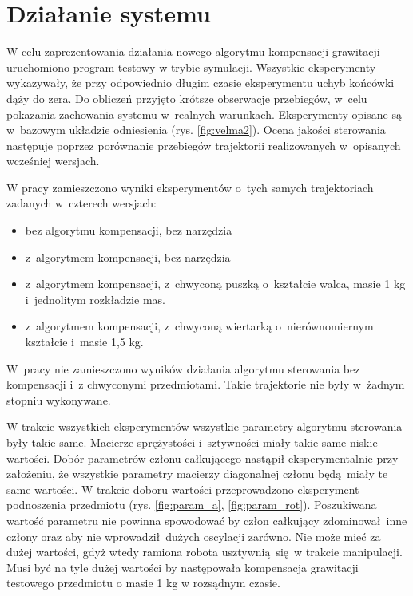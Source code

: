 
\chapter{Działanie systemu\label{chap:weryfikacja_systemu}}
\graphicspath{{../../velma/przerobione_testy/out/}{./images}}



W celu zaprezentowania działania nowego algorytmu kompensacji grawitacji uruchomiono program testowy w trybie symulacji. Wszystkie eksperymenty wykazywały, że przy odpowiednio długim czasie eksperymentu uchyb końcówki dąży do zera. Do obliczeń przyjęto krótsze obserwacje przebiegów, w~celu pokazania zachowania systemu w~realnych warunkach.  Eksperymenty opisane są w~bazowym układzie odniesienia (rys. \ref{fig:velma2}).  Ocena jakości sterowania następuje poprzez porównanie przebiegów trajektorii realizowanych w~opisanych wcześniej wersjach.

W pracy zamieszczono wyniki eksperymentów o~tych samych trajektoriach zadanych w~czterech wersjach:
\begin{itemize}
	\item bez algorytmu kompensacji, bez narzędzia
	\item z~algorytmem kompensacji, bez narzędzia
	\item z~algorytmem kompensacji, z~chwyconą puszką o~kształcie walca, masie 1 kg i~jednolitym rozkładzie mas.
	\item z~algorytmem kompensacji, z~chwyconą wiertarką o~nierównomiernym kształcie i~masie 1,5 kg.
\end{itemize}
W~pracy nie zamieszczono wyników działania algorytmu sterowania bez kompensacji i~z chwyconymi przedmiotami. Takie trajektorie nie były  w~żadnym stopniu wykonywane. 
 
W trakcie wszystkich eksperymentów wszystkie parametry algorytmu sterowania były takie same. Macierze sprężystości i~sztywności miały takie same niskie wartości. Dobór parametrów członu całkującego nastąpił eksperymentalnie przy założeniu, że wszystkie parametry macierzy diagonalnej członu będą miały te same wartości. W trakcie doboru wartości przeprowadzono eksperyment podnoszenia przedmiotu (rys. \ref{fig:param_a}, \ref{fig:param_rot}). Poszukiwana wartość parametru nie powinna spowodować by człon całkujący zdominował inne człony oraz aby nie wprowadził dużych oscylacji zarówno. Nie może mieć za dużej wartości, gdyż wtedy ramiona robota usztywnią się w trakcie manipulacji. Musi być na tyle dużej wartości by następowała kompensacja grawitacji testowego przedmiotu o masie 1 kg w rozsądnym czasie. 

